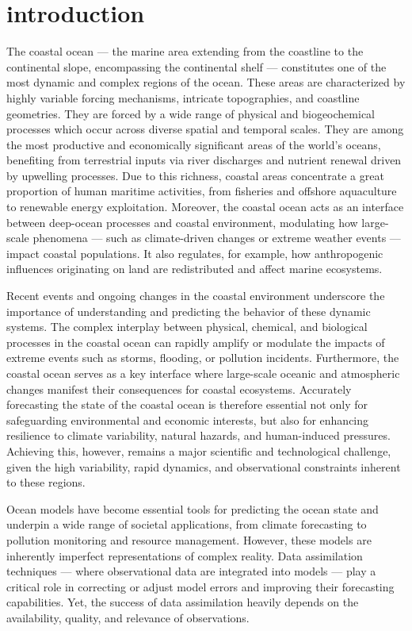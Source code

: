 \section{introduction}


The coastal ocean — the marine area extending from the coastline to the continental slope, encompassing the continental shelf — constitutes one of the most dynamic and complex regions of the ocean. These areas are characterized by highly variable forcing mechanisms, intricate topographies, and coastline geometries. They are forced by a wide range of physical and biogeochemical processes which occur across diverse spatial and temporal scales. They are among the most productive and economically significant areas of the world’s oceans, benefiting from terrestrial inputs via river discharges and nutrient renewal driven by upwelling processes.
Due to this richness, coastal areas concentrate a great proportion of human maritime activities, from fisheries and offshore aquaculture to renewable energy exploitation. Moreover, the coastal ocean acts as an interface between deep-ocean processes and coastal environment, modulating how large-scale phenomena — such as climate-driven changes or extreme weather events — impact coastal populations. It also regulates, for example, how anthropogenic influences originating on land are redistributed and affect marine ecosystems.

Recent events and ongoing changes in the coastal environment underscore the importance of understanding and predicting the behavior of these dynamic systems. The complex interplay between physical, chemical, and biological processes in the coastal ocean can rapidly amplify or modulate the impacts of extreme events such as storms, flooding, or pollution incidents. Furthermore, the coastal ocean serves as a key interface where large-scale oceanic and atmospheric changes manifest their consequences for coastal ecosystems. Accurately forecasting the state of the coastal ocean is therefore essential not only for safeguarding environmental and economic interests, but also for enhancing resilience to climate variability, natural hazards, and human-induced pressures. Achieving this, however, remains a major scientific and technological challenge, given the high variability, rapid dynamics, and observational constraints inherent to these regions.

Ocean models have become essential tools for predicting the ocean state and underpin a wide range of societal applications, from climate forecasting to pollution monitoring and resource management. However, these models are inherently imperfect representations of complex reality. Data assimilation techniques — where observational data are integrated into models — play a critical role in correcting or adjust model errors and improving their forecasting capabilities. Yet, the success of data assimilation heavily depends on the availability, quality, and relevance of observations.

